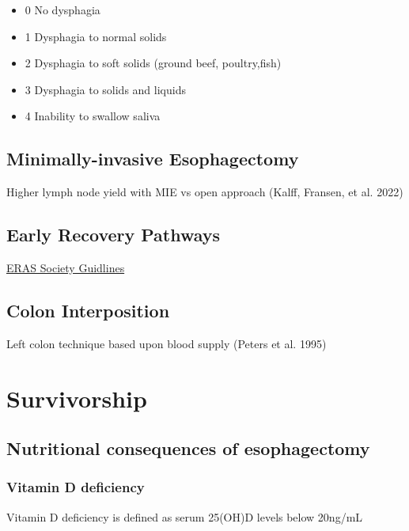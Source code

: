 \documentclass[
  letterpaper,
]{scrbook}
\providecommand{\tightlist}{%
  \setlength{\itemsep}{0pt}\setlength{\parskip}{0pt}}
\begin{document}
\begin{itemize}
\tightlist
\item
  0 No dysphagia
\item
  1 Dysphagia to normal solids
\item
  2 Dysphagia to soft solids (ground beef, poultry,fish)
\item
  3 Dysphagia to solids and liquids
\item
  4 Inability to swallow saliva
\end{itemize}

\section{Minimally-invasive
Esophagectomy}\label{minimally-invasive-esophagectomy}

Higher lymph node yield with MIE vs open approach (Kalff, Fransen, et
al. 2022)

\section{Early Recovery Pathways}\label{early-recovery-pathways}

\href{https://www.ncbi.nlm.nih.gov/pmc/articles/PMC7098920/}{ERAS
Society Guidlines}

\section{Colon Interposition}\label{colon-interposition}

Left colon technique based upon blood supply (Peters et al. 1995)

\chapter{Survivorship}\label{eso_survivorship}

\section{Nutritional consequences of
esophagectomy}\label{nutritional-consequences-of-esophagectomy}

\subsection{Vitamin D deficiency}\label{vitamin-d-deficiency}

Vitamin D deficiency is defined as serum 25(OH)D levels below 20ng/mL
\end{document}
